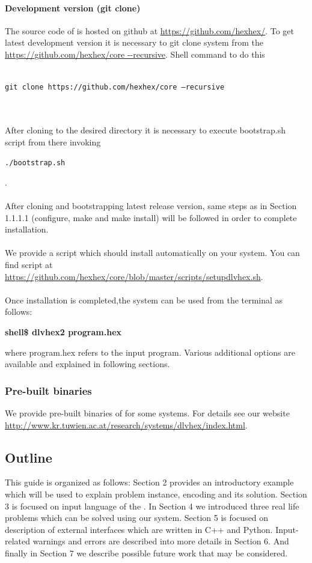 \documentclass[14pt,a4paper, titlepage]{article}
\begin{document}
\paragraph{Development version (git clone)}
The source code of \dlvhex{} is hosted on github at \url{https://github.com/hexhex/}. To get latest development version it is necessary to git clone system from the \url{https://github.com/hexhex/core --recursive}. Shell command to do this
\\ \\ \centerline{\texttt{git clone https://github.com/hexhex/core --recursive}} 
\\ \\After cloning to the desired directory it is necessary to execute bootstrap.sh script from there invoking \\ \centerline{\texttt{./bootstrap.sh}}. 
\\ \\After cloning and bootstrapping latest release version, same steps as in Section 1.1.1.1 (configure, make and make install) will be followed in order to complete installation.  \\ \\We provide a script which should install \dlvhex{} automatically on your system. You can find script at \url{https://github.com/hexhex/core/blob/master/scripts/setupdlvhex.sh}.\\ \\Once installation is completed,the system can be used from the terminal as follows:\\ 
\centerline{\textbf{shell\$ dlvhex2 program.hex}} where program.hex refers to the input program. Various additional options are available and explained in following sections.    

\subsubsection{Pre-built binaries}
We provide pre-built binaries of \dlvhex{} for some systems. For details see our website \url{http://www.kr.tuwien.ac.at/research/systems/dlvhex/index.html}. 


\subsection{Outline}
This guide is organized as follows: Section 2 provides an introductory example which will be used to explain problem instance, encoding and its solution. Section 3 is focused on input language of the \dlvhex{}. In Section 4 we introduced three real life problems which can be solved using our system. Section 5 is focused on description of external interfaces which are written in C++ and Python. Input-related warnings and errors are described into more details in Section 6. And finally in Section 7 we describe possible future work that may be considered.
\end{document}
